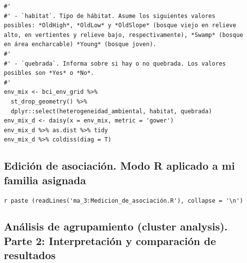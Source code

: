 \documentclass[11pt,]{article}
\begin{document}
\begin{verbatim}
#' 
#' - `habitat`. Tipo de hábitat. Asume los siguientes valores posibles: *OldHigh*, *OldLow* y *OldSlope* (bosque viejo en relieve alto, en vertientes y relieve bajo, respectivamente), *Swamp* (bosque en área encharcable) *Young* (bosque joven).
#' 
#' - `quebrada`. Informa sobre si hay o no quebrada. Los valores posibles son *Yes* o *No*.
#' 
env_mix <- bci_env_grid %>%
  st_drop_geometry() %>%
  dplyr::select(heterogeneidad_ambiental, habitat, quebrada)
env_mix_d <- daisy(x = env_mix, metric = 'gower')
env_mix_d %>% as.dist %>% tidy
env_mix_d %>% coldiss(diag = T)
\end{verbatim}

\subsection{Edición de asociación. Modo R aplicado a mi familia
asignada}\label{ediciuxf3n-de-asociaciuxf3n.-modo-r-aplicado-a-mi-familia-asignada}

\begin{verbatim}
r paste (readLines('ma_3:Medicion_de_asociación.R'), collapse = '\n')
\end{verbatim}

\subsection{Análisis de agrupamiento (cluster analysis). Parte 2:
Interpretación y comparación de
resultados}\label{anuxe1lisis-de-agrupamiento-cluster-analysis.-parte-2-interpretaciuxf3n-y-comparaciuxf3n-de-resultados}
\end{document}
